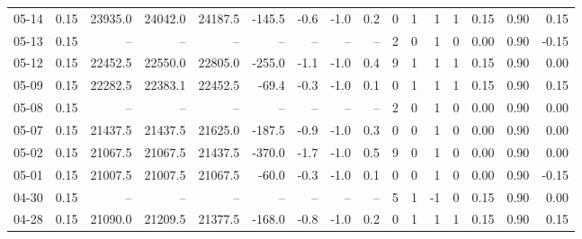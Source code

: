 \begin{threeparttable}
{\begin{tabular}{lrrrrrrrrrrrrrrr}
  05-14 &     0.15 & 23935.0 & 24042.0 & 24187.5 &     -145.5 &           -0.6 &                     -1.0 &                 0.2 &              0 &         1 &     1 &         1 &       0.15 &      0.90 &           0.15 \\
  05-13 &     0.15 &      -- &      -- &      -- &         -- &             -- &                       -- &                  -- &              2 &         0 &     1 &         0 &       0.00 &      0.90 &          -0.15 \\
  05-12 &     0.15 & 22452.5 & 22550.0 & 22805.0 &     -255.0 &           -1.1 &                     -1.0 &                 0.4 &              9 &         1 &     1 &         1 &       0.15 &      0.90 &           0.00 \\
  05-09 &     0.15 & 22282.5 & 22383.1 & 22452.5 &      -69.4 &           -0.3 &                     -1.0 &                 0.1 &              0 &         1 &     1 &         1 &       0.15 &      0.90 &           0.15 \\
  05-08 &     0.15 &      -- &      -- &      -- &         -- &             -- &                       -- &                  -- &              2 &         0 &     1 &         0 &       0.00 &      0.90 &           0.00 \\
  05-07 &     0.15 & 21437.5 & 21437.5 & 21625.0 &     -187.5 &           -0.9 &                     -1.0 &                 0.3 &              0 &         0 &     1 &         0 &       0.00 &      0.90 &           0.00 \\
  05-02 &     0.15 & 21067.5 & 21067.5 & 21437.5 &     -370.0 &           -1.7 &                     -1.0 &                 0.5 &              9 &         0 &     1 &         0 &       0.00 &      0.90 &           0.00 \\
  05-01 &     0.15 & 21007.5 & 21007.5 & 21067.5 &      -60.0 &           -0.3 &                     -1.0 &                 0.1 &              0 &         0 &     1 &         0 &       0.00 &      0.90 &          -0.15 \\
  04-30 &     0.15 &      -- &      -- &      -- &         -- &             -- &                       -- &                  -- &              5 &         1 &    -1 &         0 &       0.15 &      0.90 &           0.00 \\
  04-28 &     0.15 & 21090.0 & 21209.5 & 21377.5 &     -168.0 &           -0.8 &                     -1.0 &                 0.2 &              0 &         1 &     1 &         1 &       0.15 &      0.90 &           0.15 \\

\end{tabular}}
\end{threeparttable}
